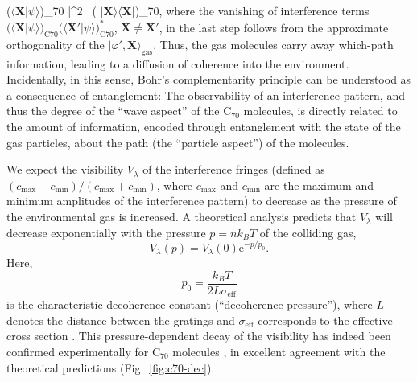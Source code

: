 \documentclass[12pt,aps,floatfix,amsmath,amssymb,showpacs,nofootinbib]{revtex4-2}
\newcommand{\be}{\begin{equation}} \newcommand{\ee}{\end{equation}}
\newcommand{\ket}[1]{\ensuremath{|{#1\rangle}}}
\newcommand{\braket}[2]{\ensuremath{{\langle #1}|{#2 \rangle}}}
\newcommand{\ketbra}[2]{\ensuremath{|{#1 \rangle}{\langle #2}|}}
\newcommand{\e}{\ensuremath{\mathrm{e}}}
\begin{document}
\bigl(\braket{\mathbf{X}}{\psi}\bigr)_{70} \bigr|^2 \,
\bigl( \ketbra{\mathbf{X}}{\mathbf{X}}\bigr)_{70},
\eea
%
where the vanishing of interference terms
$\bigl(\braket{\mathbf{X}}{\psi}\bigr)_{\text{C}70}
\bigl(\braket{\mathbf{X}'}{\psi}\bigr)_{\text{C}70}^*$, $\mathbf{X}
\not= \mathbf{X}'$, in the last step follows from the approximate
orthogonality of the $\ket{\varphi', \mathbf{X}}_\text{gas} $.  Thus,
the gas molecules carry away which-path information, leading to a
diffusion of coherence into the environment. Incidentally, in this
sense, Bohr's complementarity principle can be understood as a
consequence of entanglement: The observability of an interference
pattern, and thus the degree of the ``wave aspect'' of the C$_{70}$
molecules, is directly related to the amount of information, encoded
through entanglement with the state of the gas particles, about the
path (the ``particle aspect'') of the molecules.

We expect the visibility $V_\lambda$ of the interference fringes
(defined as $(c_\text{max} - c_\text{min}) / (c_\text{max} +
c_\text{min})$, where $c_\text{max}$ and $c_\text{min}$ are the
maximum and minimum amplitudes of the interference pattern) to
decrease as the pressure of the environmental gas is increased. A
theoretical analysis
\cite{Hackermuller:2003:uu,Hornberger:2003:un,Hornberger:2004:bb}
predicts that $V_\lambda$ will decrease exponentially with the
pressure $p = n k_B T$ of the colliding gas,
%
\be \label{eq:vis1}
V_\lambda(p) = V_\lambda(0) \e^{-p/p_0}.
\ee
%
Here, 
%
\be \label{eq:vis2}
p_0 = \frac{k_B T}{2L \sigma_\text{eff}}
\ee
%
is the characteristic decoherence constant (``decoherence pressure''),
where $L$ denotes the distance between the gratings and
$\sigma_\text{eff}$ corresponds to the effective cross section
\cite{Hackermuller:2003:uu}. This pressure-dependent decay of the
visibility has indeed been confirmed experimentally for C$_{70}$
molecules \cite{Hackermuller:2003:uu,Hornberger:2003:tv}, in excellent
agreement with the theoretical predictions (Fig.~\ref{fig:c70-dec}).
\end{document}
